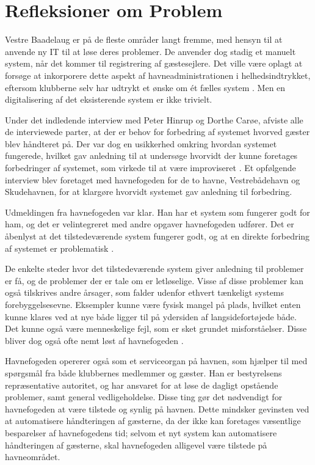 \chapter{Refleksioner om Problem}
Vestre Baadelaug er på de fleste områder langt fremme, med hensyn til at anvende ny IT til at løse deres problemer. De anvender dog stadig et manuelt system, når det kommer til registrering af gæstesejlere. Det ville være oplagt at forsøge at inkorporere dette aspekt af havneadministrationen i helhedsindtrykket, eftersom klubberne selv har udtrykt et ønske om ét fælles system \cite{int_vb_sl}. Men en digitalisering af det eksisterende system er ikke trivielt.

Under det indledende interview med Peter Hinrup og Dorthe Carøe, afviste alle de interviewede parter, at der er behov for forbedring af systemet hvorved gæster blev håndteret på. Der var dog en usikkerhed omkring hvordan systemet fungerede, hvilket gav anledning til at undersøge hvorvidt der kunne foretages forbedringer af systemet, som virkede til at være improviseret \cite{int_vb_sl}. Et opfølgende interview blev foretaget med havnefogeden for de to havne, Vestrebådehavn og Skudehavnen, for at klargøre hvorvidt systemet gav anledning til forbedring.

Udmeldingen fra havnefogeden var klar. Han har et system som fungerer godt for ham, og det er velintegreret med andre opgaver havnefogeden udfører. Det er åbenlyst at det tilstedeværende system fungerer godt, og at en direkte forbedring af systemet er problematisk \cite{int_hf}. 


De enkelte steder hvor det tilstedeværende system giver anledning til problemer er få, og de problemer der er tale om er letløselige. Visse af disse problemer kan også tilskrives andre årsager, som falder udenfor ethvert tænkeligt systems forebyggelsesevne. Eksempler kunne være fysisk mangel på plads, hvilket enten kunne klares ved at nye både ligger til på ydersiden af langsidefortøjede både. Det kunne også være menneskelige fejl, som er sket grundet misforståelser. Disse bliver dog også ofte nemt løst af havnefogeden \cite{int_hf}.

Havnefogeden opererer også som et serviceorgan på havnen, som hjælper til med spørgsmål fra både klubbernes medlemmer og gæster. Han er bestyrelsens repræsentative autoritet, og har ansvaret for at løse de dagligt opstående problemer, samt general vedligeholdelse. Disse ting gør det nødvendigt for havnefogeden at være tilstede og synlig på havnen. Dette mindsker gevinsten ved at automatisere håndteringen af gæsterne, da der ikke kan foretages væsentlige besparelser af havnefogedens tid; selvom et nyt system kan automatisere håndteringen af gæsterne, skal havnefogeden alligevel være tilstede på havneområdet.


